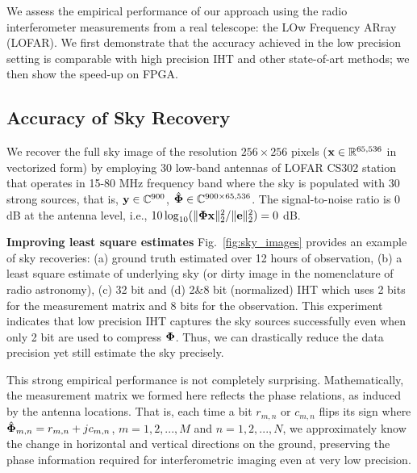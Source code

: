 \documentclass{article}
\begin{document}
We assess the empirical performance of our approach using the radio interferometer measurements from a real telescope: the LOw Frequency ARray (LOFAR). We first demonstrate that the accuracy achieved in the low precision setting is comparable with high precision IHT and other state-of-art methods; we then show the speed-up on FPGA.

\subsection{Accuracy of Sky Recovery}

We recover the full sky image of the resolution $256\times 256$ pixels (${\bf x} \in \mathbb{R}^{65,536}$ in vectorized form) by employing 30 low-band antennas of LOFAR CS302 station that operates in 15-80 MHz frequency band where the sky is populated with 30 strong sources, that is, ${\bf y} \in \mathbb{C}^{900}$, $\hat{\bf \Phi} \in \mathbb{C}^{900\times 65,536}$. The signal-to-noise ratio is 0 dB at the antenna level, i.e., $10\log_{10}(\|{\bf \Phi x}\|_2^2/\|{\bf e}\|_2^2) = 0$ dB. 

{\bf Improving least square estimates}
Fig.~\ref{fig:sky_images} provides an example of sky recoveries: (a) ground truth estimated over 12 hours of observation, (b) a least square estimate of underlying sky (or dirty image in the nomenclature of radio astronomy), (c) 32 bit and (d) 2\&8 bit (normalized) IHT which uses 2 bits for the measurement matrix and 8 bits for the observation. This experiment indicates that low precision IHT captures the sky sources successfully even when only 2 bit are used to compress ${\bf \Phi}$. Thus, we can drastically reduce the data precision yet still estimate the sky precisely.

This strong empirical performance is not completely surprising. Mathematically, the measurement matrix we formed here reflects the phase relations, as induced by the antenna locations.  That is, each time a bit $r_{m, n}$ or $c_{m, n}$ flips its sign where $\hat{\bf \Phi}_{m, n} = r_{m, n} +j c_{m,n}$, $m = {1, 2, ..., M}$ and $n = {1, 2, ..., N}$, we approximately know the change in horizontal and vertical directions on the ground, preserving the phase information required for interferometric imaging even at very low precision.
\end{document}

